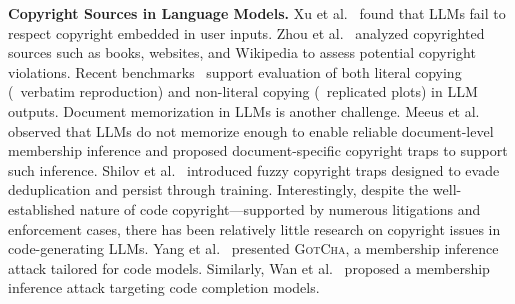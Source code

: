 \textbf{Copyright Sources in Language Models.} Xu et al.~\cite{xu2024llms} found that LLMs fail to respect copyright embedded in user inputs. Zhou et al.~\cite{zhou2024dpdllm} analyzed copyrighted sources such as books, websites, and Wikipedia to assess potential copyright violations. Recent benchmarks~\cite{chen2024copybench, liu2024shield} support evaluation of both literal copying (\eg~verbatim reproduction) and non-literal copying (\eg~replicated plots) in LLM outputs. Document memorization in LLMs is another challenge. Meeus et al.~\cite{meeus2024copyright} observed that LLMs do not memorize enough to enable reliable document-level membership inference and proposed document-specific copyright traps to support such inference. 
Shilov et al.~\cite{shilov2024mosaic} introduced fuzzy copyright traps designed to evade deduplication and persist through training. Interestingly, despite the well-established nature of code copyright—supported by numerous litigations and enforcement cases, there has been relatively little research on copyright issues in code-generating LLMs.
Yang et al.~\cite{yang2024gotcha} presented \textsc{GotCha}, a membership inference attack tailored for code models. Similarly, Wan et al.~\cite{wan2024does} proposed a membership inference attack targeting code completion models.










